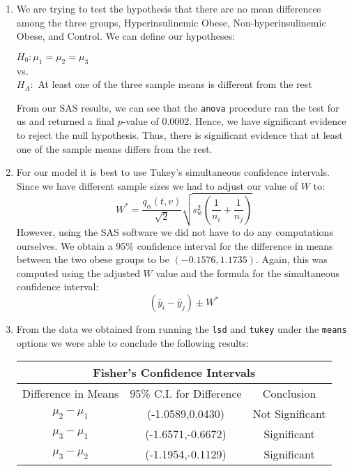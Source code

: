 \documentclass[oneside,10pt]{article}
\begin{document}
\newpage
	\begin{enumerate}[label=(\alph*)]
		\item We are trying to test the hypothesis that there are no mean differences among the three groups, Hyperinsulinemic Obese, Non-hyperinsulinemic Obese, and Control. We can define our hypotheses:
			\begin{adjustwidth}{2.5em}{0pt}
				$H_0: \mu_1 = \mu_2 =\mu_3$\\
				\hspace*{1mm} vs.\\
				$H_A:$ At least one of the three sample means is different from the rest
			\end{adjustwidth}
			From our SAS results, we can see that the \texttt{anova} procedure ran the test for us and returned a final $p$-value of 0.0002. Hence, we have significant evidence to reject the null hypothesis. Thus, there is significant evidence that at least one of the sample means differs from the rest.
		\item For our model it is best to use Tukey's simultaneous confidence intervals. Since we have different sample sizes we had to adjust our value of $W$ to: $$W^{*}=\frac{q_{\alpha}(t,v)}{\sqrt{2}}\sqrt{s_w^2\left(\frac{1}{n_i}+\frac{1}{n_j}\right)}$$ However, using the SAS software we did not have to do any computations ourselves. We obtain a 95\% confidence interval for the difference in means between the two obese groups to be $(-0.1576,1.1735)$. Again, this was computed using the adjusted $W$ value and the formula for the simultaneous confidence interval: $$\left(\bar{y}_i-\bar{y}_j\right)\pm W^{*}$$
		\item From the data we obtained from running the \texttt{lsd} and \texttt{tukey} under the \texttt{means} options we were able to conclude the following results:
		\begin{center}
			\begin{tabular}{ c c c }
				\multicolumn{3}{c}{Fisher's Confidence Intervals}\\
				\hline
				Difference in Means & 95\% C.I. for Difference & Conclusion\\
				\hline
				$\mu_2-\mu_1$ & (-1.0589,0.0430) & Not Significant\\
				$\mu_3-\mu_1$ & (-1.6571,-0.6672) & Significant\\
				$\mu_3-\mu_2$ & (-1.1954,-0.1129) & Significant\\
				\hline

\end{tabular}
\end{center}
\end{enumerate}
\end{document}
